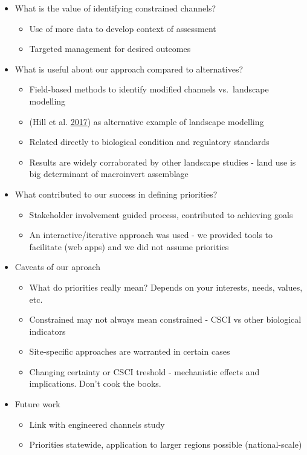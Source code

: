 \documentclass[]{article}
\providecommand{\tightlist}{%
  \setlength{\itemsep}{0pt}\setlength{\parskip}{0pt}}
\begin{document}
\begin{itemize}
\tightlist
\item
  What is the value of identifying constrained channels?

  \begin{itemize}
  \tightlist
  \item
    Use of more data to develop context of assessment
  \item
    Targeted management for desired outcomes
  \end{itemize}
\item
  What is useful about our approach compared to alternatives?

  \begin{itemize}
  \tightlist
  \item
    Field-based methods to identify modified channels vs.~landscape
    modelling
  \item
    (Hill et al. \protect\hyperlink{ref-Hill17}{2017}) as alternative
    example of landscape modelling
  \item
    Related directly to biological condition and regulatory standards
  \item
    Results are widely corraborated by other landscape studies - land
    use is big determinant of macroinvert assemblage
  \end{itemize}
\item
  What contributed to our success in defining priorities?

  \begin{itemize}
  \tightlist
  \item
    Stakeholder involvement guided process, contributed to achieving
    goals
  \item
    An interactive/iterative approach was used - we provided tools to
    facilitate (web apps) and we did not assume priorities
  \end{itemize}
\item
  Caveats of our aproach

  \begin{itemize}
  \tightlist
  \item
    What do priorities really mean? Depends on your interests, needs,
    values, etc.
  \item
    Constrained may not always mean constrained - CSCI vs other
    biological indicators
  \item
    Site-specific approaches are warranted in certain cases
  \item
    Changing certainty or CSCI treshold - mechanistic effects and
    implications. Don't cook the books.
  \end{itemize}
\item
  Future work

  \begin{itemize}
  \tightlist
  \item
    Link with engineered channels study
  \item
    Priorities statewide, application to larger regions possible
    (national-scale)
  \end{itemize}
\end{itemize}
\end{document}
